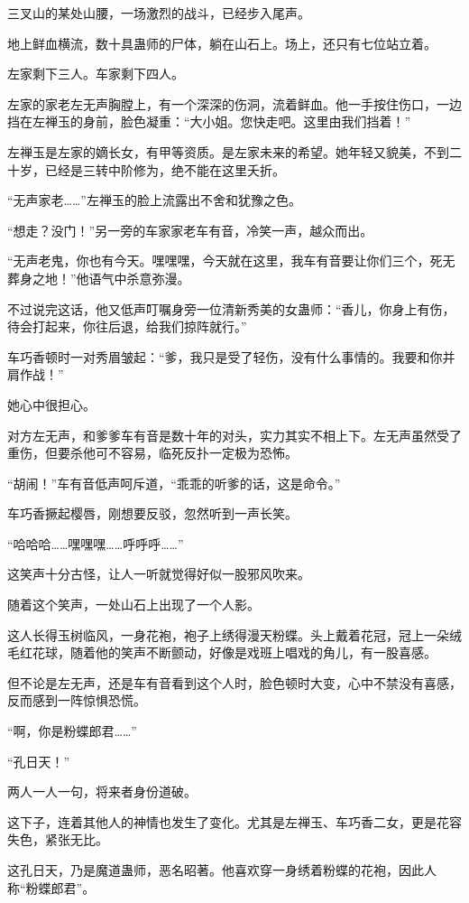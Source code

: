 \begin{this_body}
三叉山的某处山腰，一场激烈的战斗，已经步入尾声。

地上鲜血横流，数十具蛊师的尸体，躺在山石上。场上，还只有七位站立着。

左家剩下三人。车家剩下四人。

左家的家老左无声胸膛上，有一个深深的伤洞，流着鲜血。他一手按住伤口，一边挡在左禅玉的身前，脸色凝重：“大小姐。您快走吧。这里由我们挡着！”

左禅玉是左家的嫡长女，有甲等资质。是左家未来的希望。她年轻又貌美，不到二十岁，已经是三转中阶修为，绝不能在这里夭折。

“无声家老……”左禅玉的脸上流露出不舍和犹豫之色。

“想走？没门！”另一旁的车家家老车有音，冷笑一声，越众而出。

“无声老鬼，你也有今天。嘿嘿嘿，今天就在这里，我车有音要让你们三个，死无葬身之地！”他语气中杀意弥漫。

不过说完这话，他又低声叮嘱身旁一位清新秀美的女蛊师：“香儿，你身上有伤，待会打起来，你往后退，给我们掠阵就行。”

车巧香顿时一对秀眉皱起：“爹，我只是受了轻伤，没有什么事情的。我要和你并肩作战！”

她心中很担心。

对方左无声，和爹爹车有音是数十年的对头，实力其实不相上下。左无声虽然受了重伤，但要杀他可不容易，临死反扑一定极为恐怖。

“胡闹！”车有音低声呵斥道，“乖乖的听爹的话，这是命令。”

车巧香撅起樱唇，刚想要反驳，忽然听到一声长笑。

“哈哈哈……嘿嘿嘿……呼呼呼……”

这笑声十分古怪，让人一听就觉得好似一股邪风吹来。

随着这个笑声，一处山石上出现了一个人影。

这人长得玉树临风，一身花袍，袍子上绣得漫天粉蝶。头上戴着花冠，冠上一朵绒毛红花球，随着他的笑声不断颤动，好像是戏班上唱戏的角儿，有一股喜感。

但不论是左无声，还是车有音看到这个人时，脸色顿时大变，心中不禁没有喜感，反而感到一阵惊惧恐慌。

“啊，你是粉蝶郎君……”

“孔日天！”

两人一人一句，将来者身份道破。

这下子，连着其他人的神情也发生了变化。尤其是左禅玉、车巧香二女，更是花容失色，紧张无比。

这孔日天，乃是魔道蛊师，恶名昭著。他喜欢穿一身绣着粉蝶的花袍，因此人称“粉蝶郎君”。


\end{this_body}

